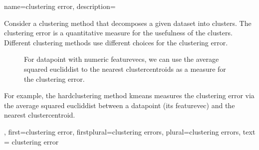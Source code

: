 {name={clustering error}, 
	description={Consider a \gls{clustering} method that decomposes 
	a given \gls{dataset} into \glspl{cluster}. The \gls{clustering} error is a quantitative 
	measure for the usefulness of the \glspl{cluster}. Different \gls{clustering} methods 
	use different choices for the \gls{clustering} error. 
	\begin{figure}
\centering
{}
\caption{For \gls{datapoint} with numeric \glspl{featurevec}, we can use the 
average squared \gls{eucliddist} to the nearest \glspl{clustercentroid} as a measure for the \gls{clustering} error.}
\end{figure}
	For example, the \gls{hardclustering} 
	method \gls{kmeans} measures the \gls{clustering} error via the average squared 
	\gls{eucliddist} between a \gls{datapoint} (its \gls{featurevec}) and the nearest \gls{clustercentroid}. 
	}, 
	first={clustering error}, 
	firstplural={clustering errors}, 
	plural={clustering errors}, 
	text = {clustering error}
}



